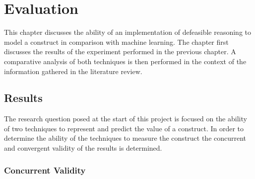 
\chapter{Evaluation} %

\label{Chapter5} %


This chapter discusses the ability of an implementation of defeasible reasoning to model a construct in comparison with machine learning. The chapter first discusses the results of the experiment performed in the previous chapter. A comparative analysis of both techniques is then performed in the context of the information gathered in the literature review.

\section{Results}


The research question posed at the start of this project is focused on the ability of two techniques to represent and predict the value of a construct. In order to determine the ability of the techniques to measure the construct the concurrent and convergent validity of the results is determined.


\subsection{Concurrent Validity}

